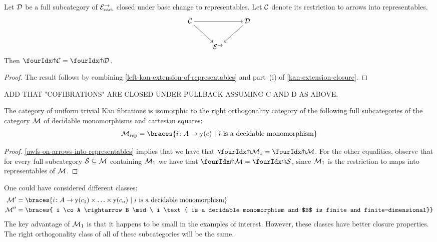 \documentclass[reqno,10pt,a4paper,oneside]{amsart}
\begin{document}
\begin{lemma}
\label{awfs-on-arrows-into-representables}
Let $\cal{D}$ be a full subcategory of $\catE_{\cart}^{\to}$ closed under base change to representables.
Let $\cal{C}$ denote its restriction to arrows into representables.
\[
\xymatrix{
  \cal{C}
  \ar[rr]
  \ar[dr]
&&
  \cal{D}
  \ar[dl]
\\&
  \catE^{\to}
}
\]
Then $\liftr{\cal{C}} = \liftr{\cal{D}}$.
\end{lemma}

\begin{proof} The result follows by combining \cref{left-kan-extension-of-representables} and part~(i) of \cref{kan-extension-closure}. 
\end{proof}

ADD THAT "COFIBRATIONS" ARE CLOSED UNDER PULLBACK ASSUMING C AND D AS ABOVE.


\begin{theorem} \label{small-gen-triv-kan}
The category of uniform trivial Kan fibrations is isomorphic to the right orthogonality 
category of the following full subcategories of  the category $\cal{M}$ of decidable
monomorphisms and cartesian squares:
\[
\cal{M}_{\textup{rep}}  = \braces{i \co A \rightarrow \yon(c) \ | \ i \text{ is a  decidable monomorphism} } 
\]
\end{theorem}

\begin{proof}    \cref{awfs-on-arrows-into-representables} implies that we have that $\liftr{\cal{M}_1}  = \liftr{\cal{M}}$.
For the other equalities, observe that for every full subcategory $\cal{S} \subseteq \cal{M}$ containing $\cal{M}_1$ we have that $\liftr{\cal{M}} = \liftr{\cal{S}}$, since $\cal{M}_1$ is the restriction to maps into representables  of $\cal{M}$. 
\end{proof}


\begin{remark} One could have considered different classes:
\begin{align*}
\cal{M}'  & = \braces{i \co A \rightarrow \yon(c_1) \times \ldots \times \yon(c_n)
\ | \ i \text{ is a  decidable monomorphism} }  \\
\cal{M}''  & = \braces{ i \co A \rightarrow B \mid \ i \text{ is a decidable monomorphism and 
$B$ is finite and finite-dimensional}} 
\end{align*}
The key advantage of $\cal{M}_1$ is that it happens to be small in the examples of interest. However, 
these classes have better closure properties. The right orthogonality class of all of these subcategories
will be the same.
\end{remark}
\end{document}
